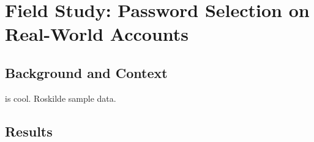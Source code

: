 
\chapter[Field Study: Password Selection on Real-World Accounts]{Field Study: Password Selection on Real-World Accounts}\label{sec:roskilde_pw}

 \section{Background and Context}
 is cool.
Roskilde sample data.
\section{Results}
